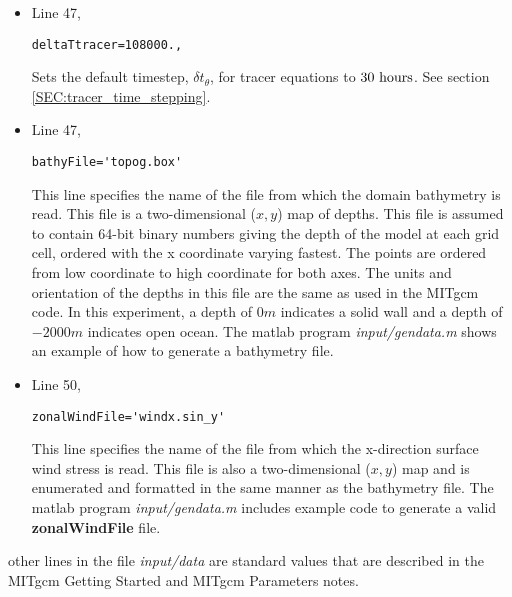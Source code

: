 \begin{itemize}

\item Line 47,
\begin{verbatim}
deltaTtracer=108000.,
\end{verbatim}
Sets the default timestep, $\delta t_{\theta}$, for tracer equations to
$30~{\rm hours}$.
See section \ref{SEC:tracer_time_stepping}.


\item Line 47,
\begin{verbatim}
bathyFile='topog.box'
\end{verbatim}
This line specifies the name of the file from which the domain
bathymetry is read. This file is a two-dimensional ($x,y$) map of
depths. This file is assumed to contain 64-bit binary numbers 
giving the depth of the model at each grid cell, ordered with the x 
coordinate varying fastest. The points are ordered from low coordinate
to high coordinate for both axes. The units and orientation of the
depths in this file are the same as used in the MITgcm code. In this
experiment, a depth of $0m$ indicates a solid wall and a depth
of $-2000m$ indicates open ocean. The matlab program
{\it input/gendata.m} shows an example of how to generate a
bathymetry file.


\item Line 50,
\begin{verbatim}
zonalWindFile='windx.sin_y'
\end{verbatim}
This line specifies the name of the file from which the x-direction
surface wind stress is read. This file is also a two-dimensional
($x,y$) map and is enumerated and formatted in the same manner as the 
bathymetry file. The matlab program {\it input/gendata.m} includes example 
code to generate a valid 
{\bf zonalWindFile} 
file.  

\end{itemize}

\noindent other lines in the file {\it input/data} are standard values
that are described in the MITgcm Getting Started and MITgcm Parameters
notes.

